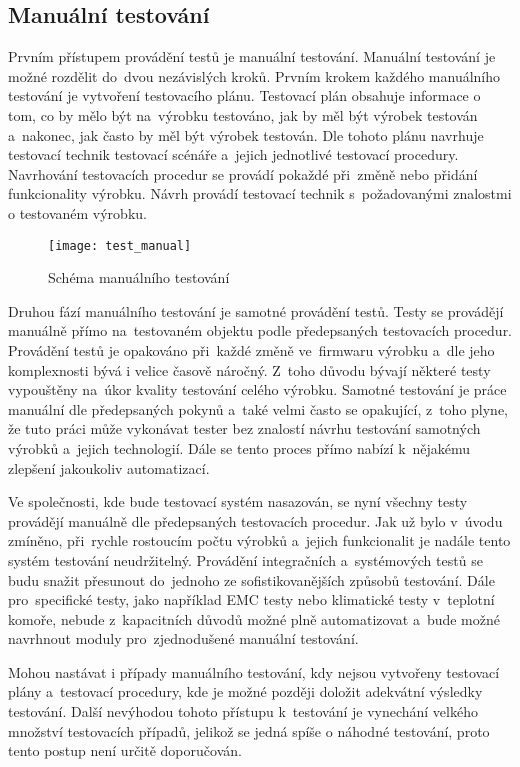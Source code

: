 \subsection{Manuální testování}
Prvním přístupem provádění testů je manuální testování. Manuální testování je možné rozdělit do~dvou nezávislých kroků. Prvním krokem každého manuálního testování je vytvoření testovacího plánu. Testovací plán obsahuje informace o tom, co by mělo být na~výrobku testováno, jak by měl být výrobek testován a~nakonec, jak často by měl být výrobek testován. Dle tohoto plánu navrhuje testovací technik testovací scénáře a~jejich jednotlivé testovací procedury. Navrhování testovacích procedur se provádí pokaždé při~změně nebo přidání funkcionality výrobku. Návrh provádí testovací technik s~požadovanými znalostmi o testovaném výrobku.

\begin{figure}[h]
  \centering
  \texttt{[image: test\_manual]}
  \caption{Schéma manuálního testování \cite{MBT}}
  \label{fig:test_manual}
\end{figure}

Druhou fází manuálního testování je samotné provádění testů. Testy se provádějí manuálně přímo na~testovaném objektu podle předepsaných testovacích procedur. Provádění testů je opakováno při~každé změně ve~firmwaru výrobku a~dle jeho komplexnosti bývá i velice časově náročný. Z~toho důvodu bývají některé testy vypouštěny na~úkor kvality testování celého výrobku. Samotné testování je práce manuální dle předepsaných pokynů a~také velmi často se opakující, z~toho plyne, že tuto práci může vykonávat tester bez znalostí návrhu testování samotných výrobků a~jejich technologií. Dále se tento proces přímo nabízí k~nějakému zlepšení jakoukoliv automatizací.

Ve společnosti, kde bude testovací systém nasazován, se nyní všechny testy provádějí manuálně dle předepsaných testovacích procedur. Jak už bylo v~úvodu zmíněno, při~rychle rostoucím počtu výrobků a~jejich funkcionalit je nadále tento systém testování neudržitelný. Provádění integračních a~systémových testů se budu snažit přesunout do~jednoho ze sofistikovanějších způsobů testování. Dále pro~specifické testy, jako například EMC testy nebo klimatické testy v~teplotní komoře, nebude z~kapacitních důvodů možné plně automatizovat a~bude možné navrhnout moduly pro~zjednodušené manuální testování.

Mohou nastávat i případy manuálního testování, kdy nejsou vytvořeny testovací plány a~testovací procedury, kde je možné později doložit adekvátní výsledky testování. Další nevýhodou tohoto přístupu k~testování je vynechání velkého množství testovacích případů, jelikož se jedná spíše o náhodné testování, proto tento postup není určitě doporučován.

